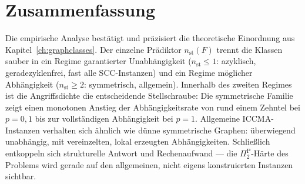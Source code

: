\section{Zusammenfassung}
\label{sec:gce-zusammenfassung}

Die empirische Analyse best\"atigt und pr\"azisiert die theoretische
Einordnung aus Kapitel~\ref{ch:graphclasses}. Der einzelne Pr\"adiktor
\(n_{\mathrm{st}}(F)\) trennt die Klassen sauber in ein Regime garantierter
Unabh\"angigkeit (\(n_{\mathrm{st}}\leq 1\): azyklisch, geradezyklenfrei, fast
alle SCC-Instanzen) und ein Regime m\"oglicher Abh\"angigkeit
(\(n_{\mathrm{st}}\geq 2\): symmetrisch, allgemein). Innerhalb des zweiten
Regimes ist die Angriffsdichte die entscheidende Stellschraube: Die
symmetrische Familie zeigt einen monotonen Anstieg der Abh\"angigkeitsrate von
rund einem Zehntel bei \(p=0{,}1\) bis zur vollst\"andigen Abh\"angigkeit bei
\(p=1\). Allgemeine ICCMA-Instanzen verhalten sich \"ahnlich wie d\"unne
symmetrische Graphen: \"uberwiegend unabh\"angig, mit vereinzelten, lokal
erzeugten Abh\"angigkeiten. Schlie\ss lich entkoppeln sich strukturelle Antwort
und Rechenaufwand --- die \(\Pi_2^{\mathrm P}\)-H\"arte des Problems wird gerade
auf den allgemeinen, nicht eigens konstruierten Instanzen sichtbar.
